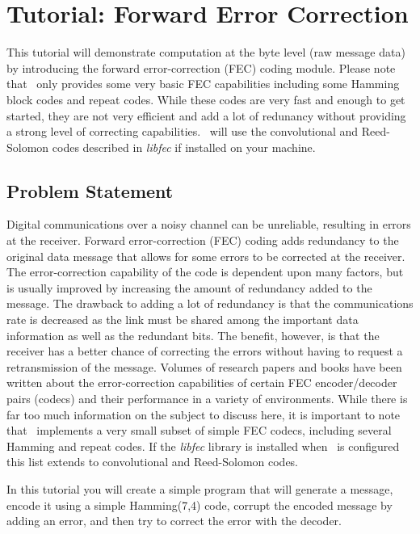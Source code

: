 % 
%

\newpage
\section{Tutorial: Forward Error Correction}
\label{tutorial:fec}

This tutorial will demonstrate computation at the byte level
(raw message data) by
introducing the forward error-correction (FEC) coding module.
Please note that \liquid\ only provides some very basic FEC
capabilities including some Hamming block codes and repeat codes.
While these codes are very fast and enough to get started,
they are not very efficient and add a lot of redunancy without providing
a strong level of correcting capabilities.
\liquid\ will use the convolutional and Reed-Solomon codes described in
{\em libfec} \cite{libfec:web} if installed on your machine.

\subsection{Problem Statement}
\label{tutorial:fec:problem}
Digital communications over a noisy channel can be unreliable,
resulting in errors at the receiver.
Forward error-correction (FEC) coding adds redundancy to the original
data message that allows for some errors to be corrected at the
receiver.
The error-correction capability of the code is dependent upon many
factors, but is usually improved by increasing the amount of redundancy
added to the message.
The drawback to adding a lot of redundancy is that the communications
rate is decreased as the link must be shared among the important data
information as well as the redundant bits.
The benefit, however, is that the receiver has a better chance of
correcting the errors without having to request a retransmission of the
message.
Volumes of research papers and books have been written about the
error-correction capabilities of certain FEC encoder/decoder pairs
(codecs) and their performance in a variety of environments.
While there is far too much information on the subject to discuss here,
it is important to note that \liquid\ implements a very small subset of
simple FEC codecs, including several Hamming and repeat codes.
If the {\em libfec} \cite{libfec:web} library is installed when \liquid\
is configured this list extends to convolutional and Reed-Solomon codes.

In this tutorial you will create a simple program that will generate a
message, encode it using a simple Hamming(7,4) code, corrupt the encoded
message by adding an error, and then try to correct the error with the
decoder.



